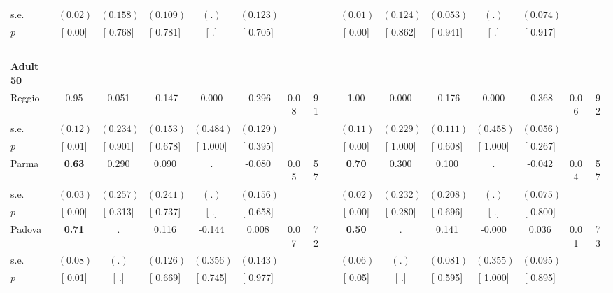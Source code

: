 \begin{longtable}{L{8em} c c c c c c c p{1em} c c c c c c c}
\quad \quad \quad \quad s.e.& $ (     0.02)$ & $ (    0.158)$ & $ (    0.109)$ & $ (        .)$ & $ (    0.123)$ & & & & $ (     0.01)$ & $ (    0.124)$ & $ (    0.053)$ & $ (        .)$ & $ (    0.074)$ & &  \\*
\quad \quad \quad \quad $ p$ & [     0.00] & [    0.768] & [    0.781] & [        .] & [    0.705] & & & & [     0.00] & [    0.862] & [    0.941] & [        .] & [    0.917] & &  \\[1em]
~\\[1em]
\quad \quad \textbf{Adult 50} & & & & & & & & & & & & & & & \\* 
\quad \quad \quad Reggio& 0.95 &     0.051 &    -0.147 &     0.000 &    -0.296 &      0.08 &        91 & & 1.00 &     0.000 &    -0.176 &     0.000 &    -0.368 &      0.06 &        92  \\*
\quad \quad \quad \quad s.e.& $ (     0.12)$ & $ (    0.234)$ & $ (    0.153)$ & $ (    0.484)$ & $ (    0.129)$ & & & & $ (     0.11)$ & $ (    0.229)$ & $ (    0.111)$ & $ (    0.458)$ & $ (    0.056)$ & &  \\*
\quad \quad \quad \quad $ p$ & [     0.01] & [    0.901] & [    0.678] & [    1.000] & [    0.395] & & & & [     0.00] & [    1.000] & [    0.608] & [    1.000] & [    0.267] & &  \\[1em]
\quad \quad \quad Parma& \textbf{     0.63} &     0.290 &     0.090 &         . &    -0.080 &      0.05 &        57 & & \textbf{     0.70} &     0.300 &     0.100 &         . &    -0.042 &      0.04 &        57  \\*
\quad \quad \quad \quad s.e.& $ (     0.03)$ & $ (    0.257)$ & $ (    0.241)$ & $ (        .)$ & $ (    0.156)$ & & & & $ (     0.02)$ & $ (    0.232)$ & $ (    0.208)$ & $ (        .)$ & $ (    0.075)$ & &  \\*
\quad \quad \quad \quad $ p$ & [     0.00] & [    0.313] & [    0.737] & [        .] & [    0.658] & & & & [     0.00] & [    0.280] & [    0.696] & [        .] & [    0.800] & &  \\[1em]
\quad \quad \quad Padova& \textbf{     0.71} &         . &     0.116 &    -0.144 &     0.008 &      0.07 &        72 & & \textbf{     0.50} &         . &     0.141 &    -0.000 &     0.036 &      0.01 &        73  \\*
\quad \quad \quad \quad s.e.& $ (     0.08)$ & $ (        .)$ & $ (    0.126)$ & $ (    0.356)$ & $ (    0.143)$ & & & & $ (     0.06)$ & $ (        .)$ & $ (    0.081)$ & $ (    0.355)$ & $ (    0.095)$ & &  \\*
\quad \quad \quad \quad $ p$ & [     0.01] & [        .] & [    0.669] & [    0.745] & [    0.977] & & & & [     0.05] & [        .] & [    0.595] & [    1.000] & [    0.895] & &  \\[1em]

\end{longtable}
